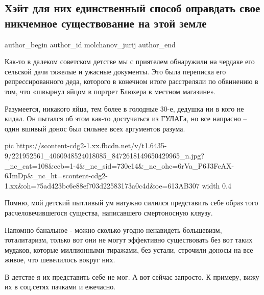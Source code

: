  
 
 
 
 
 
\subsection{Хэйт для них единственный способ оправдать свое никчемное существование на этой земле}
\label{sec:09_08_2021.fb.molchanov_jurij.1.psihologia_nenavist}
 
\ifcmt
 author_begin
   author_id molchanov_jurij
 author_end
\fi

Как-то в далеком советском детстве мы с приятелем обнаружили на чердаке его
сельской дачи тяжелые и ужасные документы. Это была переписка его
репрессированного деда, которого в конечном итоге расстреляли по обвинению в
том, что «швырнул яйцом в портрет Блюхера в местном магазине».

Разумеется, никакого яйца, тем более в голодные 30-е, дедушка ни в кого не
кидал. Он пытался об этом как-то достучаться из ГУЛАГа, но все напрасно – один
вшивый донос был сильнее всех аргументов разума.

\ifcmt
  pic https://scontent-cdg2-1.xx.fbcdn.net/v/t1.6435-9/221952561_4060948524018085_8472618149650429965_n.jpg?_nc_cat=108&ccb=1-4&_nc_sid=730e14&_nc_ohc=6rVa_P6J3FcAX-6JmDp&_nc_ht=scontent-cdg2-1.xx&oh=75ad423bc6e88ef703d22583173a0c4d&oe=613AB307
  width 0.4
\fi

Помню, мой детский пытливый ум натужно силился представить себе образ того
расчеловечившегося существа, написавшего смертоносную кляузу.

Напомню банальное - можно сколько угодно ненавидеть большевизм, тоталитаризм,
только вот они не могут эффективно существовать без вот таких мудаков, которые
миллионными тиражами, без устали, строчили доносы на все живое, что шевелилось
вокруг них.

В детстве я их представить себе не мог. А вот сейчас запросто. К примеру, вижу
их в соц.сетях пачками и ежечасно.

